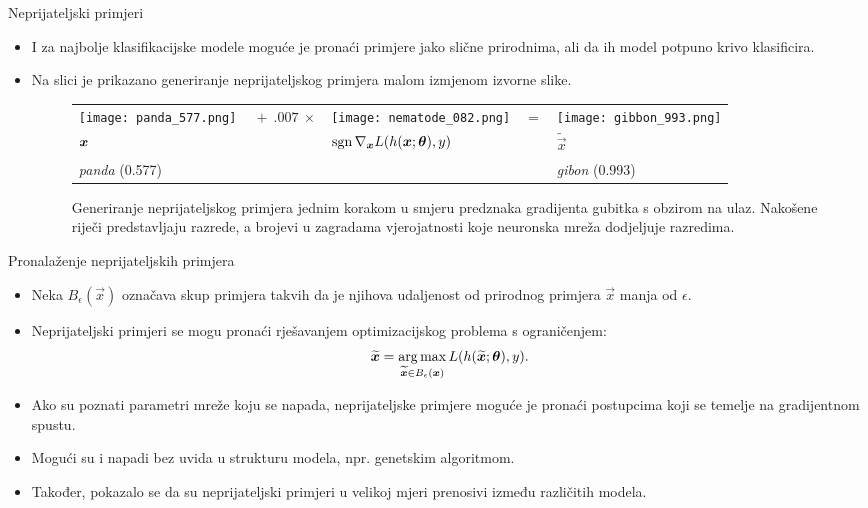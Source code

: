 \documentclass{beamer}
\begin{document}
\begin{frame}{Neprijateljski primjeri}
\begin{itemize}
	\item I za najbolje klasifikacijske modele moguće je pronaći primjere jako slične prirodnima, ali da ih model potpuno krivo klasificira.
	\item Na slici je prikazano generiranje neprijateljskog primjera malom izmjenom izvorne slike.	
\begin{figure}[htbp]
	\centering
	\begin{tabular}{>{\centering\arraybackslash}m{}m{.5in}>{\centering\arraybackslash}m{}m{.1in}>{\centering\arraybackslash}m{}}
		\centering\arraybackslash
		\texttt{[image: panda\_577.png]} &%
		\centering\arraybackslash%
		$\ +\ .007\ \times$ &%
		\texttt{[image: nematode\_082.png]} &%
		$=$ & %
		\texttt{[image: gibbon\_993.png]} \\
		$\centering \vec x$     &%
		& $\sgn \nabla_{\vec x} L(h(\vec x;\vec\theta), y)$ & & $\widetilde{\vec x}$ \\
		\emph{panda} (0.577) & & & & \emph{gibon} (0.993) 
	\end{tabular}
	\caption{Generiranje neprijateljskog primjera jednim korakom u smjeru predznaka gradijenta gubitka s obzirom na ulaz. Nakošene riječi predstavljaju razrede, a brojevi u zagradama vjerojatnosti koje neuronska mreža dodjeljuje razredima.}
	\label{panda}
\end{figure}	
\end{itemize}
\end{frame}
\note[itemize]{}

\begin{frame}{Pronalaženje neprijateljskih primjera}
	\begin{itemize}
		\item Neka $ B_\epsilon(\vec x)$ označava skup primjera takvih da je njihova udaljenost od prirodnog primjera $\vec x$ manja od $\epsilon$. 
		\item Neprijateljski primjeri se mogu pronaći rješavanjem optimizacijskog problema s ograničenjem:
		\begin{equation}
		\widetilde{\vec x} = \argmax_{\widetilde{\vec x}\in B_\epsilon(\vec x)} L(h(\widetilde{\vec x};\vec \theta), y).
		\end{equation}
		\item Ako su poznati parametri mreže koju se napada, neprijateljske primjere moguće je pronaći postupcima koji se temelje na gradijentnom spustu.
		\item Mogući su i napadi bez uvida u strukturu modela, npr. genetskim algoritmom.
		\item Također, pokazalo se da su neprijateljski primjeri u velikoj mjeri prenosivi između različitih modela.
	\end{itemize}
\end{frame}
\end{document}
